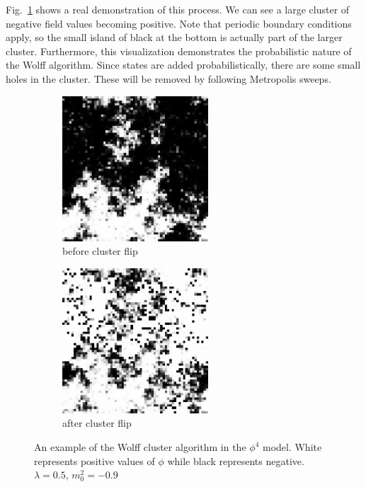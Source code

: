 \documentclass[12pt]{report}
\begin{document}
Fig.~\ref{fig:wolff} shows a real demonstration of this process. We can see a large cluster of negative field values becoming positive. Note that periodic boundary conditions apply, so the small island of black at the bottom is actually part of the larger cluster. Furthermore, this visualization demonstrates the probabilistic nature of the Wolff algorithm. Since states are added probabilistically, there are some small holes in the cluster. These will be removed by following Metropolis sweeps.
\begin{figure}[h]
  \centering
      \begin{subfigure}[b]{0.5\textwidth}\centering
        \includegraphics[width=0.6\textwidth]{imgs/wolffa.png}
        \caption{before cluster flip}
      \end{subfigure}%
      \hfill
      \begin{subfigure}[b]{0.5\textwidth}\centering
        \includegraphics[width=0.6\textwidth]{imgs/wolffb.png}
        \caption{after cluster flip}
      \end{subfigure}
      \hfill
      \caption{\label{fig:wolff} An example of the Wolff cluster algorithm in the $\phi^4$ model. White represents positive values of $\phi$ while black represents negative. $\lambda=0.5$, $m_0^2=-0.9$}
  
\end{figure}
\end{document}
